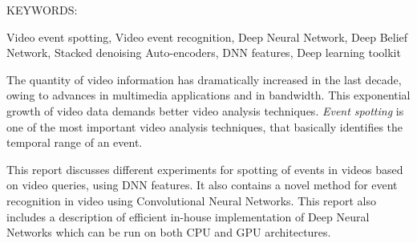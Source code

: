 \abstract

\noindent KEYWORDS: \hspace*{0.5em} \parbox[t]{4.4in}{Video event spotting, Video event recognition, Deep Neural Network, Deep Belief Network, Stacked denoising Auto-encoders, DNN features, Deep learning toolkit }

\vspace*{24pt}

The quantity of video information has dramatically increased in the last decade, owing to advances in multimedia applications and in bandwidth.  This exponential growth of video data demands better video analysis techniques.  \textit{Event spotting} is one of the most important video analysis techniques, that basically identifies the temporal range of an event.

This report discusses different experiments for spotting of events in videos based on video queries, using DNN features.  It also contains a novel method for event recognition in video using Convolutional Neural Networks.  This report also includes a description of efficient in-house implementation of Deep Neural Networks which can be run on both CPU and GPU architectures.
\pagebreak